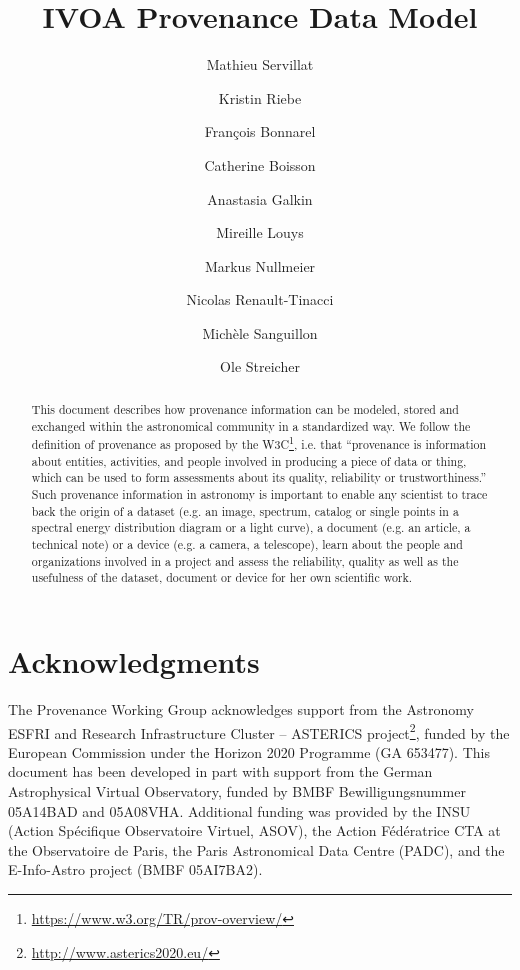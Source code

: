 \documentclass[11pt,a4paper]{ivoa}
\author{Mathieu Servillat}
\author{Kristin Riebe}
\author{François Bonnarel}
\author{Catherine Boisson}
\author{Anastasia Galkin}
\author{Mireille Louys}
\author{Markus Nullmeier}
\author{Nicolas Renault-Tinacci}
\author{Michèle Sanguillon}
\author{Ole Streicher}
\begin{document}

\lstset{escapechar=@,style=customc}

\title{IVOA Provenance Data Model}


\begin{abstract}
This document describes how provenance information can be modeled, stored and exchanged within the astronomical community in a standardized way.
We follow the definition of provenance as proposed by the W3C\footnote{\url{https://www.w3.org/TR/prov-overview/}}, i.e. that ``provenance is information about entities, activities, and people involved in producing a piece of data or thing, which can be used to form assessments about its quality, reliability or trustworthiness.''
Such provenance information in astronomy is important to enable any scientist to trace back the origin of a dataset (e.g. an image, spectrum, catalog or single points in a spectral energy distribution diagram or a light curve), a document (e.g. an article, a technical note) or a device (e.g. a camera, a telescope), learn about the people and organizations involved in a project and assess the reliability, quality as well as the usefulness of the dataset, document or device for her own scientific work.
\end{abstract}

\section*{Acknowledgments}

The Provenance Working Group acknowledges support from the Astronomy ESFRI and Research Infrastructure Cluster – ASTERICS project\footnote{\url{http://www.asterics2020.eu/}}, funded by the European Commission under the Horizon 2020 Programme (GA 653477).
This document has been developed in part with support from the German Astrophysical Virtual Observatory, funded by BMBF Bewilligungsnummer 05A14BAD and 05A08VHA.
Additional funding was provided by the INSU (Action Spécifique Observatoire Virtuel, ASOV), the Action Fédératrice CTA at the Observatoire de Paris, the Paris Astronomical Data Centre (PADC), and the E-Info-Astro project (BMBF 05AI7BA2).
\end{document}
